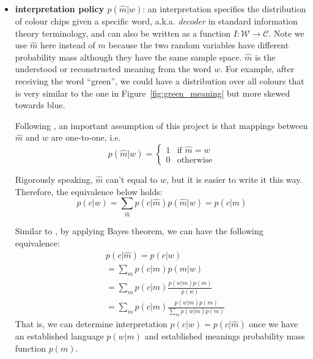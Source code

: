 \documentclass[11pt]{article}
\begin{document}
\begin{itemize}[leftmargin=*]
    \item \textbf{interpretation policy $p(\hat{m}|w)$\label{par:decoder}}: an interpretation specifies the distribution of colour chips given a specific word, a.k.a. \emph{decoder} in standard information theory terminology, and can also be written as a function $I:\mathcal{W}\rightarrow\mathcal{C}$.
    Note we use $\hat{m}$ here instead of $m$ because the two random variables have different probability mass although they have the same sample space. 
    $\hat{m}$ is the understood or reconstructed meaning from the word $w$.
    For example, after receiving the word ``green'', we could have a distribution over all colours that is very similar to the one in Figure~\ref{fig:green_meaning} but more skewed towards blue.
    
    Following \citet{zaslavsky2018efficient}, an important assumption of this project is that mappings between $\hat{m}$ and $w$ are one-to-one, i.e.
    \begin{equation}
        p(\hat{m}|w) =
        \begin{cases}
            1 & \text{if $\hat{m}=w$}\\
            0 & \text{otherwise}
        \end{cases} 
        \label{eq:bijective_mhat_w}
    \end{equation}
    
    Rigorously speaking, $\hat{m}$ can't equal to $w$, but it is easier to write it this way. Therefore, the equivalence below holds:
    \begin{equation}
        p(c|w)  = \sum_{\hat{m}} p(c|\hat{m})p(\hat{m}|w)  = p(c|\hat{m})
        \label{eq:p_mhat_and_m}
    \end{equation}
    
    Similar to \citep{zaslavsky2018efficient}, by applying Bayes theorem, we can have the following equivalence:
    \begin{equation}
        \begin{split}
            & p(c|\hat{m}) = p(c|w) \\
            & = \sum_m p(c|m)p(m|w) \\
            & = \sum_m p(c|m) \frac{p(w|m)p(m)}{p(w)} \\
            & = \sum_m p(c|m) \frac{p(w|m)p(m)}{\sum_m p(w|m)p(m)}
        \end{split}
        \label{eq:bayesian_interpretation}
    \end{equation}
    That is, we can determine interpretation $p(c|w) = p(c|\hat{m})$ once we have an established language $p(w|m)$ and established meanings probability mass function $p(m)$.
\end{itemize}
\end{document}
